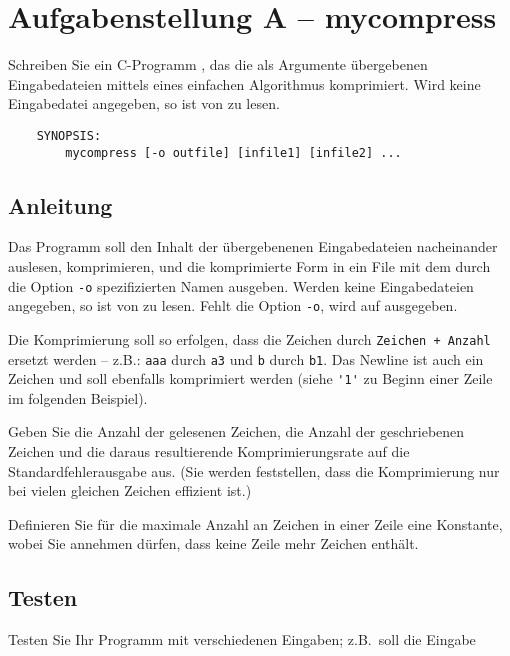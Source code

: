 




\section*{Aufgabenstellung A -- mycompress}
      Schreiben Sie ein C-Programm ,
      das die als Argumente übergebenen Eingabedateien mittels
      eines einfachen Algorithmus komprimiert.
      Wird keine Eingabedatei angegeben, so ist von
       zu lesen.
\begin{verbatim}
    SYNOPSIS:
        mycompress [-o outfile] [infile1] [infile2] ...
\end{verbatim}

\subsection*{Anleitung}
      Das Programm soll den Inhalt der übergebenenen Eingabedateien
      nacheinander auslesen, komprimieren, und die komprimierte Form in ein
      File mit dem durch die Option \verb|-o| spezifizierten Namen
       ausgeben.
      Werden keine Eingabedateien angegeben, so ist von  zu
      lesen.
      Fehlt die Option \verb|-o|, wird auf  ausgegeben.

      Die Komprimierung soll so erfolgen, dass die Zeichen durch
      \verb|Zeichen + Anzahl| ersetzt werden -- z.B.: \verb|aaa| durch
      \verb|a3| und \verb|b| durch \verb|b1|.
      Das Newline ist auch ein Zeichen und soll ebenfalls komprimiert werden
      (siehe \verb|'1'| zu Beginn einer Zeile im folgenden Beispiel).

      Geben Sie die Anzahl der gelesenen Zeichen, die Anzahl der geschriebenen
      Zeichen und die daraus resultierende Komprimierungsrate
      auf die Standardfehlerausgabe  aus.
      (Sie werden feststellen, dass die Komprimierung nur bei vielen gleichen
      Zeichen effizient ist.)

      Definieren Sie für die maximale Anzahl an Zeichen in einer
      Zeile eine Konstante, wobei Sie annehmen dürfen, dass keine
      Zeile mehr Zeichen enthält.

\subsection*{Testen}
      Testen Sie Ihr Programm mit verschiedenen Eingaben; z.B.\ soll
      die Eingabe

